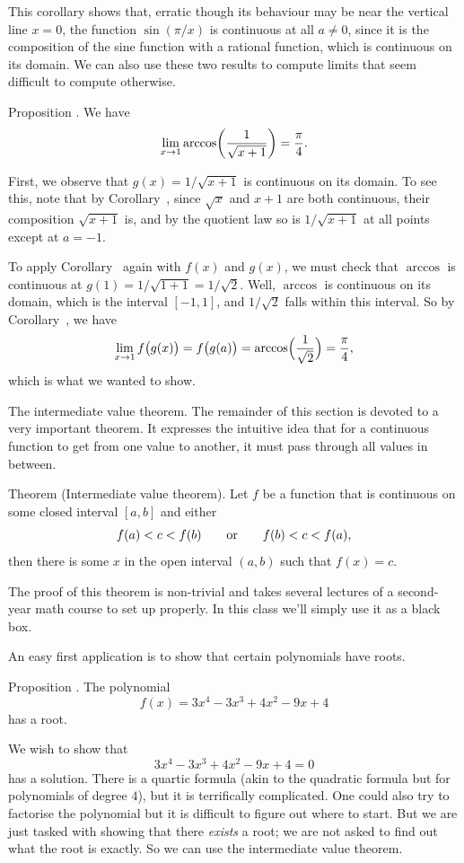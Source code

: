 This corollary shows that, erratic though its behaviour may be near the vertical line $x=0$, the function
$\sin(\pi/x)$ is continuous at all $a\ne 0$, since it is the composition of the sine function with a
rational function, which is continuous on its domain. We can also use these two results
to compute limits that seem difficult to compute otherwise.

\proclaim Proposition \advthm. We have
$$\lim_{x\to 1} \arccos\biggl( {1\over \sqrt{x+1}}\biggr) = {\pi\over 4}.$$

\proof
First, we observe that $g(x) = 1/\sqrt{x+1}$ is continuous on its domain.
To see this, note that by Corollary~{\corcontcomp},
since $\sqrt x$ and $x+1$ are both continuous, their composition
$\sqrt{x+1}$ is, and by the quotient law so is $1/\sqrt{x+1}$ at all points except at $a=-1$.

To apply
Corollary~{\corcontcomp} again with $f(x)$ and $g(x)$, we must check that $\arccos$ is continuous at
$g(1) = 1/\sqrt{1+1} = 1/\sqrt 2$. Well, $\arccos$ is continuous on its domain, which is the interval
$[-1,1]$, and $1/\sqrt 2$ falls within this interval. So by Corollary~{\corcontcomp}, we have
$$\lim_{x\to 1} f\bigl(g(x)\bigr) = f\bigl(g(a)\bigr) = \arccos\Bigl({1\over \sqrt 2}\Bigr) = {\pi\over 4},$$
which is what we wanted to show.\slug

\medskip\boldlabel {} The intermediate value theorem.
The remainder of this section is devoted to
a very important theorem. It expresses the intuitive idea that for a continuous
function to get from one value to another, it must pass through all values in between.

\parenproclaim Theorem {\advthm} (Intermediate value theorem).
Let $f$ be a function that is continuous on some closed interval $[a,b]$ and either
$$f(a) < c < f(b) \qquad\hbox{or}\qquad f(b) < c < f(a),$$
then there is some $x$ in the open interval $(a,b)$ such that $f(x) = c$.

The proof of this theorem is non-trivial and takes several lectures of a second-year math course
to set up properly. In this class we'll simply use it as a black box.

An easy first application is to show that certain polynomials have roots.

\proclaim Proposition \advthm. The polynomial
$$f(x) = 3x^4 - 3x^3 + 4x^2 - 9x + 4$$
has a root.

\proof We wish to show that
$$3x^4 - 3x^3 + 4x^2 - 9x + 4 = 0$$
has a solution. There is a quartic formula (akin to the quadratic formula but for polynomials of degree
$4$), but it is terrifically complicated. One could also try to factorise the polynomial but it is difficult
to figure out where to start.
But we are just tasked with showing that there {\it exists} a root; we are not asked to find out what
the root is exactly. So we can use the intermediate value theorem.

